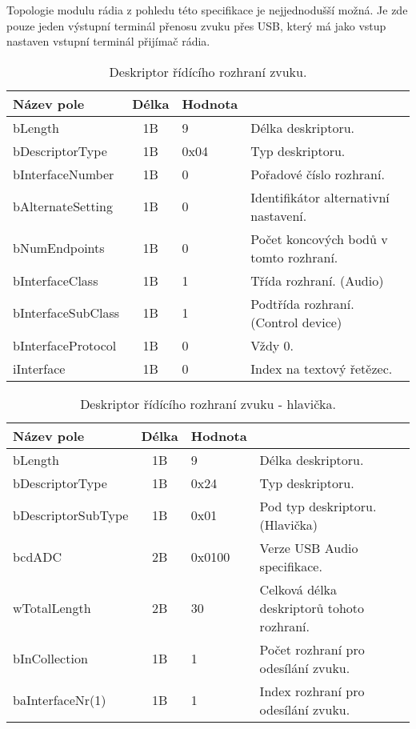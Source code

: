 Topologie modulu rádia z pohledu této specifikace je nejjednodušší možná. Je zde pouze jeden výstupní terminál přenosu zvuku přes USB, který má jako vstup nastaven vstupní terminál přijímač rádia.


\begin{table}
\begin{center}
\begin{tabular}{|l|c|l|l|}
\hline 
Název pole & Délka & Hodnota &  \\ 
\hline
bLength & 1B & 9 & Délka deskriptoru.\\
\hline
bDescriptorType & 1B & 0x04 & Typ deskriptoru. \\
\hline
bInterfaceNumber & 1B & 0 & Pořadové číslo rozhraní.\\
\hline
bAlternateSetting & 1B & 0 & Identifikátor alternativní nastavení.\\
\hline
bNumEndpoints & 1B & 0 & Počet koncových bodů v tomto rozhraní.\\
\hline
bInterfaceClass & 1B & 1 & Třída rozhraní. (Audio)\\
\hline
bInterfaceSubClass & 1B & 1 & Podtřída rozhraní. (Control device)\\
\hline
bInterfaceProtocol & 1B & 0 & Vždy 0. \\
\hline
iInterface & 1B & 0 & Index na textový řetězec.\\
\hline
\end{tabular} 
\end{center}
\caption{Deskriptor řídícího rozhraní zvuku.}
\label{tab:usb-aud-ctrl} 
\end{table}


\begin{table}
\begin{center}
\begin{tabular}{|l|c|l|l|}
\hline 
Název pole & Délka & Hodnota &  \\ 
\hline
bLength & 1B & 9 & Délka deskriptoru.\\
\hline
bDescriptorType & 1B & 0x24 & Typ deskriptoru. \\
\hline
bDescriptorSubType & 1B & 0x01 & Pod typ deskriptoru. (Hlavička)\\
\hline
bcdADC & 2B & 0x0100 & Verze USB Audio specifikace.\\
\hline
wTotalLength & 2B & 30 & Celková délka deskriptorů tohoto rozhraní.\\
\hline
bInCollection & 1B & 1 & Počet rozhraní pro odesílání zvuku.\\
\hline
baInterfaceNr(1) & 1B & 1 & Index rozhraní pro odesílání zvuku.\\
\hline
\end{tabular}  
\end{center}
\caption{Deskriptor řídícího rozhraní zvuku - hlavička.}
\label{tab:usb-aud-ctrl-head} 
\end{table}

